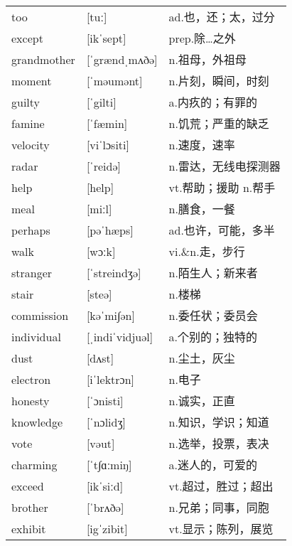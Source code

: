 \documentclass[a4paper]{article}
\begin{document}
\section{}
\begin{tabular}{l l l}

too & [tuː] & ad.也，还；太，过分 \\
except & [ikˈsept] & prep.除…之外 \\
grandmother & [ˈgrændˌmʌðə] & n.祖母，外祖母 \\
moment & [ˈməumənt] & n.片刻，瞬间，时刻 \\
guilty & [ˈgilti] & a.内疚的；有罪的 \\
famine & [ˈfæmin] & n.饥荒；严重的缺乏 \\
velocity & [viˈlɔsiti] & n.速度，速率 \\
radar & [ˈreidə] & n.雷达，无线电探测器 \\
help & [help] & vt.帮助；援助 n.帮手 \\
meal & [miːl] & n.膳食，一餐 \\
perhaps & [pəˈhæps] & ad.也许，可能，多半 \\
walk & [wɔːk] & vi.\&n.走，步行 \\
stranger & [ˈstreindʒə] & n.陌生人；新来者 \\
stair & [steə] & n.楼梯 \\
commission & [kəˈmi∫ən] & n.委任状；委员会 \\
individual & [ˌindiˈvidjuəl] & a.个别的；独特的 \\
dust & [dʌst] & n.尘土，灰尘 \\
electron & [iˈlektrɔn] & n.电子 \\
honesty & [ˈɔnisti] & n.诚实，正直 \\
knowledge & [ˈnɔlidʒ] & n.知识，学识；知道 \\
vote & [vəut] & n.选举，投票，表决 \\
charming & [ˈt∫ɑːmiŋ] & a.迷人的，可爱的 \\
exceed & [ikˈsiːd] & vt.超过，胜过；超出 \\
brother & [ˈbrʌðə] & n.兄弟；同事，同胞 \\
exhibit & [igˈzibit] & vt.显示；陈列，展览 \\

\end{tabular}
\end{document}

